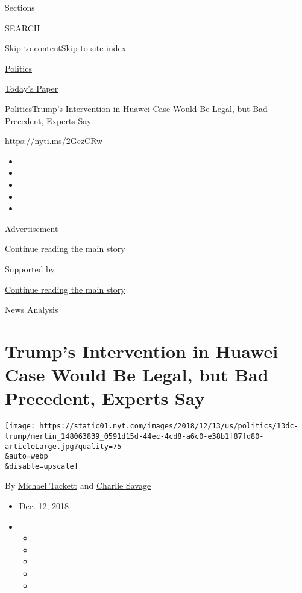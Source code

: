Sections

SEARCH

\protect\hyperlink{site-content}{Skip to
content}\protect\hyperlink{site-index}{Skip to site index}

\href{https://www.nytimes.com/section/politics}{Politics}

\href{https://myaccount.nytimes.com/auth/login?response_type=cookie\&client_id=vi}{}

\href{https://www.nytimes.com/section/todayspaper}{Today's Paper}

\href{/section/politics}{Politics}\textbar{}Trump's Intervention in
Huawei Case Would Be Legal, but Bad Precedent, Experts Say

\url{https://nyti.ms/2GezCRw}

\begin{itemize}
\item
\item
\item
\item
\item
\end{itemize}

Advertisement

\protect\hyperlink{after-top}{Continue reading the main story}

Supported by

\protect\hyperlink{after-sponsor}{Continue reading the main story}

News Analysis

\hypertarget{trumps-intervention-in-huawei-case-would-be-legal-but-bad-precedent-experts-say}{%
\section{Trump's Intervention in Huawei Case Would Be Legal, but Bad
Precedent, Experts
Say}\label{trumps-intervention-in-huawei-case-would-be-legal-but-bad-precedent-experts-say}}

\texttt{[image: https://static01.nyt.com/images/2018/12/13/us/politics/13dc-trump/merlin\_148063839\_0591d15d-44ec-4cd8-a6c0-e38b1f87fd80-articleLarge.jpg?quality=75\\\&auto=webp\\\&disable=upscale]}

By \href{https://www.nytimes.com/by/michael-tackett}{Michael Tackett}
and \href{https://www.nytimes.com/by/charlie-savage}{Charlie Savage}

\begin{itemize}
\item
  Dec. 12, 2018
\item
  \begin{itemize}
  \item
  \item
  \item
  \item
  \item
  \end{itemize}
\end{itemize}

